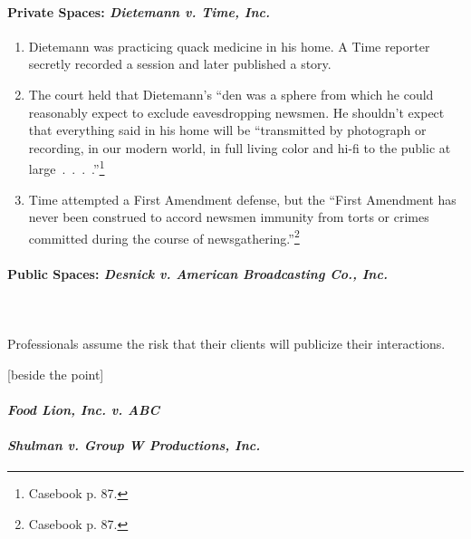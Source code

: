 \paragraph{Private Spaces: \emph{Dietemann v. Time, Inc.}}

\begin{enumerate}
    \item Dietemann was practicing quack medicine in his home. A Time reporter 
    secretly recorded a session and later published a story.
    \item The court held that Dietemann's ``den was a sphere from which he could 
    reasonably expect to exclude eavesdropping newsmen. He shouldn't expect that 
    everything said in his home will be ``transmitted by photograph or 
    recording, in our modern world, in full living color and hi-fi to the public 
    at large~.~.~.~.''\footnote{Casebook p. 87.}
    \item Time attempted a First Amendment defense, but the ``First Amendment 
    has never been construed to accord newsmen immunity from torts or crimes 
    committed during the course of newsgathering.''\footnote{Casebook p. 87.}
\end{enumerate}

\paragraph{Public Spaces: \emph{Desnick v. American Broadcasting Co., Inc.}}
~\\\\
Professionals assume the risk that their clients will publicize their interactions.

[beside the point] %

\paragraph{\emph{Food Lion, Inc. v. ABC}}


\paragraph{\emph{Shulman v. Group W Productions, Inc.}}


